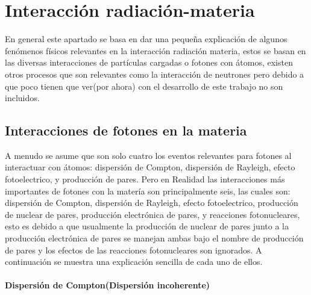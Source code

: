 
\clearpage

\section{Interacción radiación-materia}
\label{sec:INT}
En general este apartado se basa en dar una pequeña explicación de algunos fenómenos físicos relevantes en la interacción radiación materia, estos se basan en las diversas interacciones de partículas cargadas o fotones con átomos, existen otros procesos que son relevantes como la interacción de neutrones pero debido a que poco tienen que ver(por ahora) con el desarrollo de este trabajo no son incluidos.
\subsection{Interacciones de fotones en la materia}
 A menudo se asume que son solo cuatro los eventos relevantes para fotones al interactuar con átomos: dispersión de Compton, dispersión de Rayleigh, efecto fotoelectrico, y producción de pares.
Pero en Realidad las interacciones más importantes de fotones con la matería son principalmente seis, las cuales son: dispersión de Compton, dispersión de Rayleigh, efecto fotoelectrico, producción de nuclear de pares, producción electrónica de pares, y reacciones fotonucleares, esto es debido a que usualmente la producción de nuclear de pares junto a la producción electrónica de pares se manejan ambas bajo el nombre de producción de pares y los efectos de las reacciones fotonucleares son ignorados. A continuación se muestra una explicación sencilla de cada uno de ellos.

\paragraph{Dispersión de Compton(Dispersión incoherente)}

